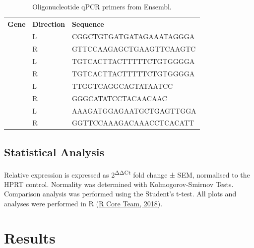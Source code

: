 \documentclass[
  11pt,
]{article}
\begin{document}
\begin{table}[!h]

\caption{\label{tab:primers}Oligonucleotide qPCR primers from Ensembl.}
\begin{tabu} to 
\toprule
Gene & Direction & Sequence\\
\midrule
 & L & CGGCTGTGATGATAGAAATAGGGA\\

 & R & GTTCCAAGAGCTGAAGTTCAAGTC\\

 & L & TGTCACTTACTTTTTCTGTGGGGA\\

 & R & TGTCACTTACTTTTTCTGTGGGGA\\

 & L & TTGGTCAGGCAGTATAATCC\\

 & R & GGGCATATCCTACAACAAC\\

 & L & AAAGATGGAGAATGCTGAGTTGGA\\

 & R & GGTTCCAAAGACAAACCTCACATT\\
\bottomrule
\end{tabu}
\end{table}

\hypertarget{statistical-analysis}{%
\subsection{Statistical Analysis}\label{statistical-analysis}}

Relative expression is expressed as 2\textsuperscript{ΔΔCt} fold change ± SEM, normalised to the HPRT control.
Normality was determined with Kolmogorov-Smirnov Tests.
Comparison analysis was performed using the Student's t-test.
All plots and analyses were performed in R (\protect\hyperlink{ref-R}{R Core Team, 2018}).

\hypertarget{results}{%
\section{Results}\label{results}}
\end{document}
